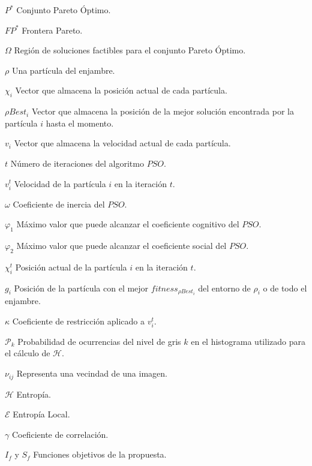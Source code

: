 \begin{abbreviations}
    \item[$P^*$] Conjunto Pareto Óptimo.
    \item[$FP^*$] Frontera Pareto.
    \item[$\Omega$] Región de soluciones factibles para el conjunto Pareto Óptimo.
    \item[$\rho$] Una partícula del enjambre.
    \item[$\chi _i$] Vector que almacena la posición actual de cada partícula.
    \item[$\rho{Best_i}$] Vector que almacena la posición de la mejor solución encontrada por la partícula $i$ hasta el momento.
    \item[$v_i$] Vector que almacena la velocidad actual de cada partícula.
    \item[$t$] Número de iteraciones del algoritmo $PSO$.
    \item[$v^{t}_i$] Velocidad de la partícula $i$ en la iteración $t$.
    \item[$\omega$] Coeficiente de inercia del $PSO$.
    \item[$\varphi_1$] Máximo valor que puede alcanzar el coeficiente cognitivo del $PSO$.
    \item[$\varphi_2$] Máximo valor que puede alcanzar el coeficiente social del $PSO$.
    \item[$\chi^{t}_i$] Posición actual de la partícula $i$ en la iteración $t$.
    \item[$g_i$] Posición de la partícula con el mejor $fitness_{\rho{Best_i}}$ del entorno de $\rho_i$ o de todo el enjambre.
    \item[$\kappa$] Coeficiente de restricción aplicado a $v^{t}_i$.
    
    
    \item[$\mathcal{P}_k$] Probabilidad de ocurrencias del nivel de gris $k$ en el histograma utilizado para el cálculo de $\mathscr{H}$.
    \item[$\nu_{ij}$]   Representa una vecindad de una imagen.
    \item[$\mathscr{H}$] Entropía.
    \item[$\mathscr E$] Entropía Local.
    
     \item[$\gamma$] Coeficiente de correlación.
     \item[$I_f$ y $S_f$] Funciones objetivos de la propuesta.
     

\end{abbreviations}
